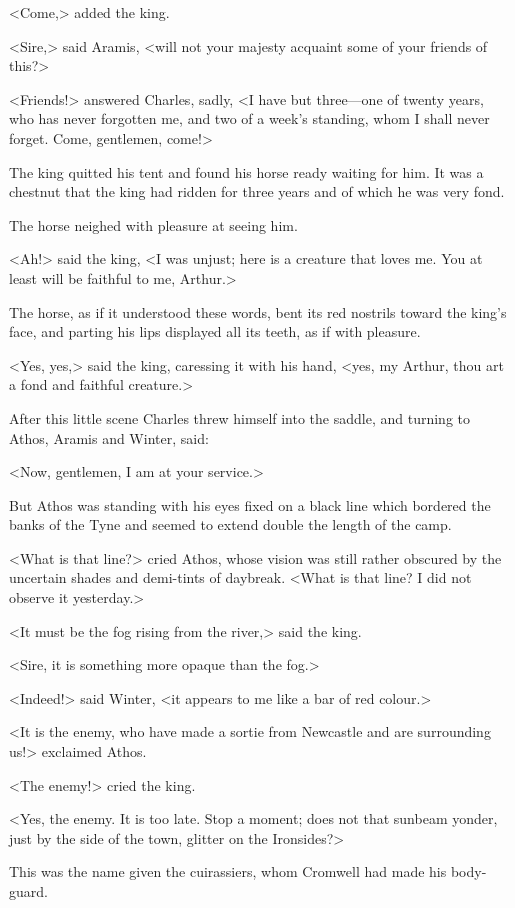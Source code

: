 <Come,> added the king.

<Sire,> said Aramis, <will not your majesty acquaint some of your friends of this?>

<Friends!> answered Charles, sadly, <I have but three—one of twenty years, who has never forgotten me, and two of a week's standing, whom I shall never forget. Come, gentlemen, come!>

The king quitted his tent and found his horse ready waiting for him. It was a chestnut that the king had ridden for three years and of which he was very fond.

The horse neighed with pleasure at seeing him.

<Ah!> said the king, <I was unjust; here is a creature that loves me. You at least will be faithful to me, Arthur.>

The horse, as if it understood these words, bent its red nostrils toward the king's face, and parting his lips displayed all its teeth, as if with pleasure.

<Yes, yes,> said the king, caressing it with his hand, <yes, my Arthur, thou art a fond and faithful creature.>

After this little scene Charles threw himself into the saddle, and turning to Athos, Aramis and Winter, said:

<Now, gentlemen, I am at your service.>

But Athos was standing with his eyes fixed on a black line which bordered the banks of the Tyne and seemed to extend double the length of the camp.

<What is that line?> cried Athos, whose vision was still rather obscured by the uncertain shades and demi-tints of daybreak. <What is that line? I did not observe it yesterday.>

<It must be the fog rising from the river,> said the king.

<Sire, it is something more opaque than the fog.>

<Indeed!> said Winter, <it appears to me like a bar of red colour.>

<It is the enemy, who have made a sortie from Newcastle and are surrounding us!> exclaimed Athos.

<The enemy!> cried the king.

<Yes, the enemy. It is too late. Stop a moment; does not that sunbeam yonder, just by the side of the town, glitter on the Ironsides?>

This was the name given the cuirassiers, whom Cromwell had made his body-guard.

